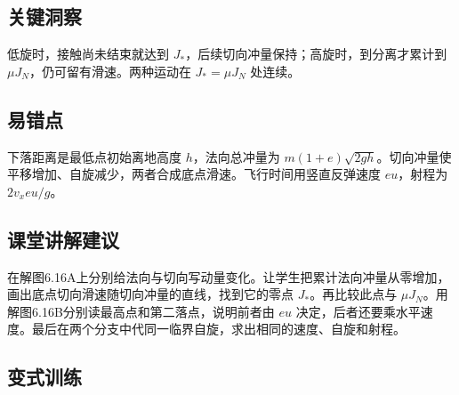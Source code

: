 \documentclass[UTF8,fontset=fandol,a4paper,11pt]{ctexart}
\begin{document}


\subsection*{关键洞察}

低旋时，接触尚未结束就达到 $J_*$，后续切向冲量保持；高旋时，到分离才累计到 $\mu J_N$，仍可留有滑速。两种运动在 $J_* =\mu J_N$ 处连续。



\subsection*{易错点}

下落距离是最低点初始离地高度 $h$，法向总冲量为 $m(1+e)\sqrt{2gh}$。切向冲量使平移增加、自旋减少，两者合成底点滑速。飞行时间用竖直反弹速度 $eu$，射程为 $2v_xeu/g$。



\subsection*{课堂讲解建议}

在解图6.16A上分别给法向与切向写动量变化。让学生把累计法向冲量从零增加，画出底点切向滑速随切向冲量的直线，找到它的零点 $J_*$。再比较此点与 $\mu J_N$。用解图6.16B分别读最高点和第二落点，说明前者由 $eu$ 决定，后者还要乘水平速度。最后在两个分支中代同一临界自旋，求出相同的速度、自旋和射程。




\subsection*{变式训练}
\end{document}
